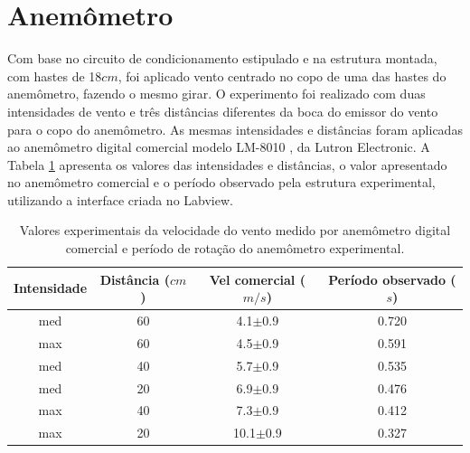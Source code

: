 \documentclass[a4paper]{instrumentacao}
\begin{document}

\section{Anemômetro}

Com base no circuito de condicionamento estipulado e na estrutura montada, com hastes de 18$cm$, foi aplicado vento centrado no copo de uma das hastes do anemômetro, fazendo o mesmo girar. O experimento foi realizado com duas intensidades de vento e três distâncias diferentes da boca do emissor do vento para o copo do anemômetro. As mesmas intensidades e distâncias foram aplicadas ao anemômetro digital comercial modelo LM-8010 \cite{anemometro-manual}, da Lutron Electronic. A Tabela \ref{tab:anemometro-amostras-comercial-periodo} apresenta os valores das intensidades e distâncias, o valor apresentado no anemômetro comercial e o período observado pela estrutura experimental, utilizando a interface criada no Labview.

\begin{table}[H]
\centering
\caption{Valores experimentais da velocidade do vento medido por anemômetro digital comercial e período de rotação do anemômetro experimental.}
\label{tab:anemometro-amostras-comercial-periodo}
\begin{tabular}{|c|c|c|c|}
\hline
\textbf{Intensidade} & \textbf{Distância ($cm$)} & \textbf{Vel comercial ($m/s$)} & \textbf{Período observado ($s$)} \\ \hline
med               & 60                      & 4.1$\pm$0.9                           & 0.720                          \\ \hline
max               & 60                      & 4.5$\pm$0.9                           & 0.591                          \\ \hline
med               & 40                      & 5.7$\pm$0.9                           & 0.535                          \\ \hline
med               & 20                      & 6.9$\pm$0.9                           & 0.476                          \\ \hline
max               & 40                      & 7.3$\pm$0.9                           & 0.412                          \\ \hline
max               & 20                      & 10.1$\pm$0.9                          & 0.327                          \\ \hline
\end{tabular}
\end{table}
\end{document}
